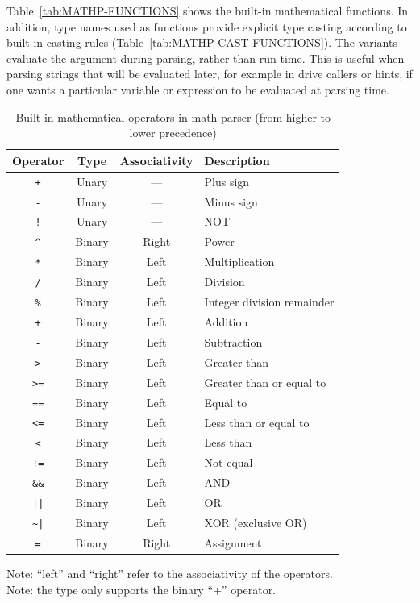 Table~\ref{tab:MATHP-FUNCTIONS} shows the built-in
mathematical functions.
In addition, type names used as functions provide explicit type casting
according to built-in casting rules (Table~\ref{tab:MATHP-CAST-FUNCTIONS}).
The  variants evaluate the argument during parsing, rather than run-time.
This is useful when parsing strings that will be evaluated later, for example in  drive callers
or hints, if one wants a particular variable or expression to be evaluated at parsing time.

\begin{table}
	\begin{center}
	\caption{Built-in mathematical operators in math parser
	(from higher to lower precedence)}\label{tab:MATHP-OPERATORS}
	\begin{tabular}{cccl}
		\hline
		\textbf{Operator} & 
		\textbf{Type} &
		\textbf{Associativity} &
		\textbf{Description} \\
		\hline
		\texttt{+} & Unary & --- & Plus sign \\
		\texttt{-} & Unary & --- & Minus sign \\
		\texttt{!} & Unary & --- & NOT \\
		\hline
		\texttt{\^} & Binary & Right & Power \\
		\hline
		\texttt{*} & Binary & Left & Multiplication \\
		\texttt{/} & Binary & Left & Division \\
		\texttt{\%} & Binary & Left & Integer division remainder \\
		\hline
		\texttt{+} & Binary & Left & Addition \\
		\texttt{-} & Binary & Left & Subtraction \\
		\hline
		\texttt{>} & Binary & Left & Greater than \\
		\texttt{>=} & Binary & Left & Greater than or equal to \\
		\texttt{==} & Binary & Left & Equal to \\
		\texttt{<=} & Binary & Left & Less than or equal to \\
		\texttt{<} & Binary & Left & Less than \\
		\texttt{!=} & Binary & Left & Not equal \\
		\hline
		\texttt{\&\&} & Binary & Left & AND \\
		\texttt{||} & Binary & Left & OR \\
		\texttt{\~{}|} & Binary & Left & XOR (exclusive OR) \\
		\hline
		\texttt{=} & Binary & Right & Assignment \\
		\hline
	\end{tabular}
	\end{center}
	\footnotesize
	Note: ``left'' and ``right'' refer to the associativity
	of the operators. \\
	Note: the  type only supports the binary ``+'' operator.
\end{table}

